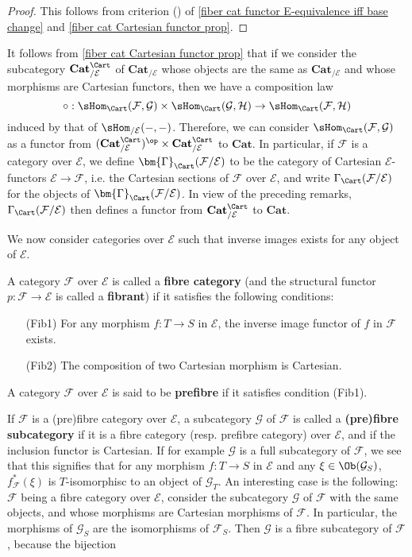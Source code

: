 \begin{proof}
This follows from criterion () of \cref{fiber cat functor E-equivalence iff base change} and \cref{fiber cat Cartesian functor prop}.
\end{proof}
It follows from \cref{fiber cat Cartesian functor prop} that if we consider the subcategory $\mathbf{Cat}_{/\mathcal{E}}^{\Cart}$ of $\mathbf{Cat}_{/\mathcal{E}}$ whose objects are the same as $\mathbf{Cat}_{/\mathcal{E}}$ and whose morphisms are Cartesian functors, then we have a composition law
\[\circ:\sHom_{\Cart}(\mathcal{F},\mathcal{G})\times\sHom_{\Cart}(\mathcal{G},\mathcal{H})\to \sHom_{\Cart}(\mathcal{F},\mathcal{H})\]
induced by that of $\sHom_{/\mathcal{E}}(-,-)$. Therefore, we can consider $\sHom_{\Cart}(\mathcal{F},\mathcal{G})$ as a functor from $(\mathbf{Cat}_{/\mathcal{E}}^{\Cart})^{\op}\times\mathbf{Cat}_{/\mathcal{E}}^{\Cart}$ to $\mathbf{Cat}$. In particular, if $\mathcal{F}$ is a category over $\mathcal{E}$, we define $\bm{\Gamma}_{\Cart}(\mathcal{F}/\mathcal{E})$ to be the category of Cartesian $\mathcal{E}$-functors $\mathcal{E}\to \mathcal{F}$, i.e. the Cartesian sections of $\mathcal{F}$ over $\mathcal{E}$, and write $\Gamma_{\Cart}(\mathcal{F}/\mathcal{E})$ for the objects of $\bm{\Gamma}_{\Cart}(\mathcal{F}/\mathcal{E})$. In view of the preceding remarks, $\Gamma_{\Cart}(\mathcal{F}/\mathcal{E})$ then defines a functor from $\mathbf{Cat}_{/\mathcal{E}}^{\Cart}$ to $\mathbf{Cat}$.\par
We now consider categories over $\mathcal{E}$ such that inverse images exists for any object of $\mathcal{E}$.
\begin{definition}
A category $\mathcal{F}$ over $\mathcal{E}$ is called a \textbf{fibre category} (and the structural functor $p:\mathcal{F}\to \mathcal{E}$ is called a \textbf{fibrant}) if it satisfies the following conditions:
\begin{enumerate}[leftmargin=40pt]
\item[(Fib1)] For any morphism $f:T\to S$ in $\mathcal{E}$, the inverse image functor of $f$ in $\mathcal{F}$ exists.
\item[(Fib2)] The composition of two Cartesian morphism is Cartesian.
\end{enumerate}
A category $\mathcal{F}$ over $\mathcal{E}$ is said to be \textbf{prefibre} if it satisfies condition (Fib1).
\end{definition}
If $\mathcal{F}$ is a (pre)fibre category over $\mathcal{E}$, a subcategory $\mathcal{G}$ of $\mathcal{F}$ is called a \textbf{(pre)fibre subcategory} if it is a fibre category (resp. prefibre category) over $\mathcal{E}$, and if the inclusion functor is Cartesian. If for example $\mathcal{G}$ is a full subcategory of $\mathcal{F}$, we see that this signifies that for any morphism $f:T\to S$ in $\mathcal{E}$ and any $\xi\in\Ob(\mathcal{G}_S)$, $f^*_\mathcal{F}(\xi)$ is $T$-isomorphisc to an object of $\mathcal{G}_T$. An interesting case is the following: $\mathcal{F}$ being a fibre category over $\mathcal{E}$, consider the subcategory $\mathcal{G}$ of $\mathcal{F}$ with the same objects, and whose morphisms are Cartesian morphisms of $\mathcal{F}$. In particular, the morphisms of $\mathcal{G}_S$ are the isomorphisms of $\mathcal{F}_S$. Then $\mathcal{G}$ is a fibre subcategory of $\mathcal{F}$, because the bijection

